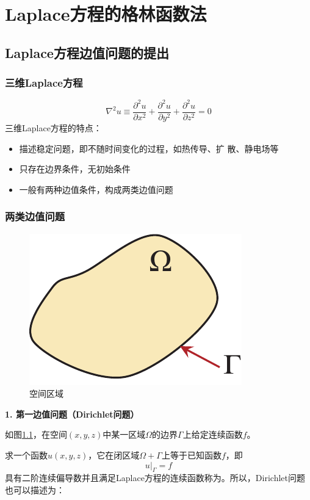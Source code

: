\chapter{Laplace方程的格林函数法}
\thispagestyle{empty}
\section{Laplace方程边值问题的提出}
\subsection{三维Laplace方程}
\begin{equation}
	\nabla^2 u \equiv \dfrac{\partial^2 u}{\partial x^2} + \dfrac{\partial^2 u}{\partial y^2} + \dfrac{\partial^2 u}{\partial z^2} = 0
\end{equation}
三维Laplace方程的特点：
\begin{itemize}
	\item 描述稳定问题，即不随时间变化的过程，如热传导、扩
散、静电场等
	\item 只存在边界条件，无初始条件
	\item 一般有两种边值条件，构成两类边值问题
\end{itemize}
\vspace*{0.5em}

\subsection{两类边值问题}
\vspace*{-2em}
\begin{figure}[!htb]
	\centering
	\includegraphics[width=0.2\linewidth]{pic/格林无点.pdf}
	\vspace*{-0.5em}
	\caption{空间区域}
	\label{格林1}
\end{figure}

\noindent \textbf{1. 第一边值问题（Dirichlet问题）}

如图\ref{格林1}，在空间$(x,y,z)$中某一区域$\Omega$的边界$\Gamma$上给定连续函数$f$。

求一个函数$u(x,y,z)$，它在闭区域$\Omega+\Gamma$上等于已知函数$f$，即
\begin{equation}
	u\big|_{\Gamma} = f
\end{equation}
具有二阶连续偏导数并且满足Laplace方程的连续函数称为。所以，Dirichlet问题也可以描述为：

